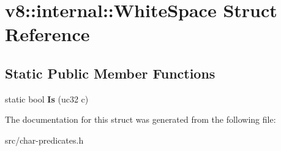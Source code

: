 \hypertarget{structv8_1_1internal_1_1_white_space}{}\section{v8\+:\+:internal\+:\+:White\+Space Struct Reference}
\label{structv8_1_1internal_1_1_white_space}
\subsection*{Static Public Member Functions}
\begin{DoxyCompactItemize}
\item 
\hypertarget{structv8_1_1internal_1_1_white_space_a742f4c26248d45e46b14d19382b43747}{}static bool {\bfseries Is} (uc32 c)\label{structv8_1_1internal_1_1_white_space_a742f4c26248d45e46b14d19382b43747}

\end{DoxyCompactItemize}


The documentation for this struct was generated from the following file\+:\begin{DoxyCompactItemize}
\item 
src/char-\/predicates.\+h\end{DoxyCompactItemize}
